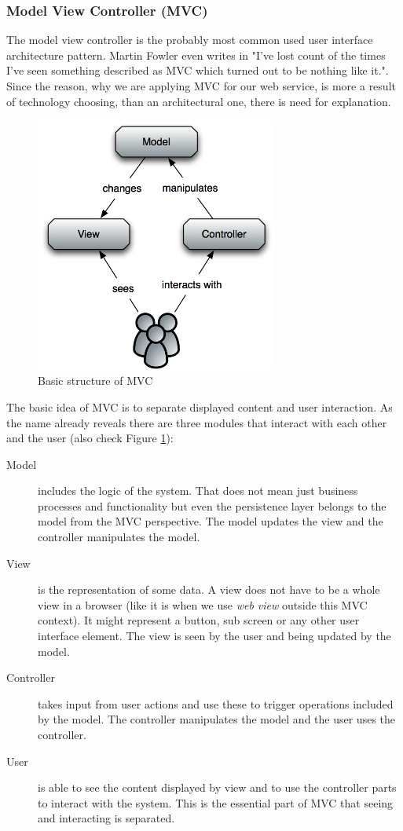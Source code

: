 \subsubsection*{Model View Controller (MVC)}
The model view controller is the probably most common used user interface architecture pattern. Martin Fowler even writes in \cite{fowler2006gui} "I've lost count of the times I've seen something described as MVC which turned out to be nothing like it.". Since the reason, why we are applying MVC for our web service, is more a result of technology choosing, than an architectural one, there is need for explanation.

\begin{figure}\centering
		\includegraphics[width=8cm]{images/mvc-expl.png}
		\caption{Basic structure of MVC}
		\label{mvc-expl}
\end{figure} 


The basic idea of MVC is to separate displayed content and user interaction. As the name already reveals there are three modules that interact with each other and the user (also check Figure \ref{mvc-expl}):

\begin{description}
\item[Model] includes the logic of the system. That does not mean just business processes and functionality but even the persistence layer belongs to the model from the MVC perspective. 
The model updates the view and the controller manipulates the model.

\item[View] is the representation of some data. A view does not have to be a whole view in a browser (like it is when we use \emph{web view} outside this MVC context). It might represent a button, sub screen or any other user interface element.
The view is seen by the user and being updated by the model.

\item[Controller] takes input from user actions and use these to trigger operations included by the model. 
The controller manipulates the model and the user uses the controller.

\item[User] is able to see the content displayed by view and to use the controller parts to interact with the system. This is the essential part of MVC that seeing and interacting is separated. 
\end{description}

